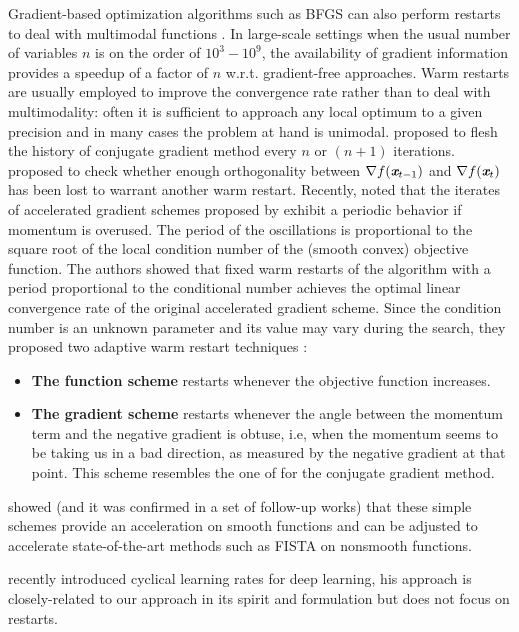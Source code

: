 \documentclass{article}
\newcommand{\vc}[1]{\textit{\textbf{#1}}}
\begin{document}
Gradient-based optimization algorithms such as BFGS can also perform 
restarts to deal with multimodal functions \citep{ros2009benchmarking}. In large-scale settings when the usual number of variables $n$ is on the order of $10^3-10^9$, the availability of gradient information provides a speedup of a factor of $n$ w.r.t. gradient-free approaches. Warm restarts are usually employed to improve the convergence rate rather than to deal with multimodality: often it is sufficient to approach any local optimum to a given precision and in many cases the problem at hand is unimodal. 
\cite{fletcher1964function} proposed to flesh the history of conjugate gradient method every $n$ or $(n + 1)$ iterations. \cite{powell1977restart} proposed to check whether enough orthogonality between $\nabla f(\vc{x}_{t-1})$ and $\nabla f(\vc{x}_t)$ has been lost to warrant another warm restart.
Recently, \cite{o2012adaptive} noted that the iterates of accelerated gradient schemes proposed by \cite{nesterov1983method,nesterov2013introductory} exhibit a periodic behavior if momentum is  overused. The period of the oscillations is proportional to the square root of the local condition number of the (smooth convex) objective function. 
The authors showed that fixed warm restarts of the algorithm with a period proportional to the conditional number achieves the optimal linear convergence rate of the original accelerated gradient scheme. 
Since the condition number is an unknown parameter and its value may vary during the search, 
they proposed two adaptive warm restart techniques \citep{o2012adaptive}: 

\begin{itemize}
	\item \textbf{{The function scheme}} restarts whenever the objective function increases.
	\item \textbf{{The gradient scheme}} restarts whenever the angle between the	momentum term and the negative
gradient is obtuse, i.e, when the momentum seems to be taking us in a bad direction, as measured by the negative gradient at that point. This scheme resembles the one of \cite{powell1977restart} for the conjugate gradient method. 
\end{itemize}

\cite{o2012adaptive} showed (and it was confirmed in a set of follow-up works) that these simple schemes provide an acceleration on smooth functions and can be adjusted to accelerate state-of-the-art methods such as FISTA on nonsmooth functions. 

\cite{smith2015no,smith2016} recently introduced cyclical learning rates for deep learning, his approach is closely-related to our approach in its spirit and formulation but does not focus on restarts.   
\end{document}

